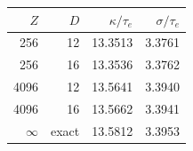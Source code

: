 \begin{tabular}{rrrr}\toprule
$Z$ & $D$ & $\kappa/\tau_e$ & $\sigma/\tau_e$\\\midrule
256 & 12 & 13.3513 & 3.3761 \\
256 & 16 & 13.3536 & 3.3762 \\
4096 & 12 & 13.5641 & 3.3940 \\
4096 & 16 & 13.5662 & 3.3941 \\
$\infty$ & exact & 13.5812 & 3.3953 \\
\bottomrule\end{tabular}

